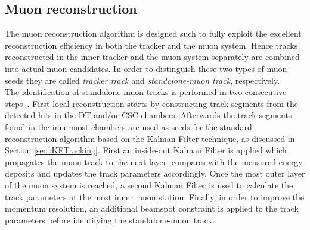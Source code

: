 \subsection{Muon reconstruction}\label{subsec::Muon}

The muon reconstruction algorithm is designed such to fully exploit the excellent reconstruction efficiency in both the tracker and the muon system.
Hence tracks reconstructed in the inner tracker and the muon system separately are combined into actual muon candidates. In order to distinguish these two types of muon-seeds they are called \textit{tracker track} and \textit{standalone-muon track}, respectively.
\\
The identification of standalone-muon tracks is performed in two consecutive steps~\cite{}. First local reconstruction starts by constructing track segments from the detected hits in the DT and/or CSC chambers. Afterwards the track segments found in the innermost chambers are used as seeds for the standard reconstruction algorithm based on the Kalman Filter technique, as discussed in Section \ref{sec::KFTracking}. First an inside-out Kalman Filter is applied which propagates the muon track to the next layer, compares with the measured energy deposits and updates the track parameters accordingly. Once the most outer layer of the muon system is reached, a second Kalman Filter is used to calculate the track parameters at the most inner muon station. Finally, in order to improve the momentum resolution, an additional beamspot constraint is applied to the track parameters before identifying the standalone-muon track.

